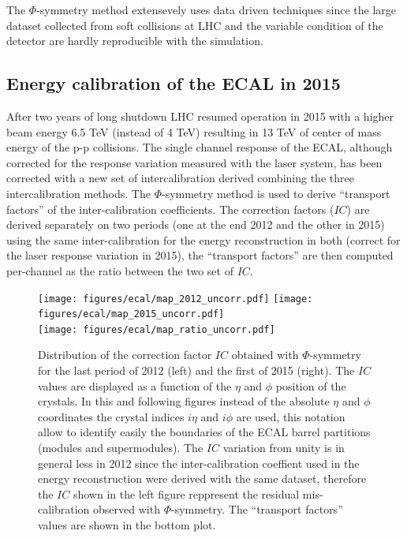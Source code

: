 The $\Phi$-symmetry method extensevely uses data driven techniques since the large dataset collected from soft collisions
at LHC and the variable condition of the detector are hardly reproducible with the simulation.

\subsection{Energy calibration of the ECAL in 2015}
\label{sec:calib_2015}

After two years of long shutdown LHC resumed operation in 2015 with a higher beam energy 6.5 TeV (instead of 4 TeV) resulting
in 13 TeV of center of mass energy of the p-p collisions. The single channel response of the ECAL, although corrected
for the response variation measured with the laser system, has been corrected with a new set of intercalibration
derived combining the three intercalibration methods. The $\Phi$-symmetry method is used to derive ``transport factors''
of the inter-calibration coefficients. The correction factors ($IC$) are derived separately on two periods
(one at the end 2012 and the other in 2015) using the same inter-calibration for the energy reconstruction in both
(correct for the laser response variation in 2015), the ``transport factors'' are then computed per-channel as the
ratio between the two set of $IC$.

\begin{figure}[h!]
  \centering
  \texttt{[image: figures/ecal/map\_2012\_uncorr.pdf]}
  \texttt{[image: figures/ecal/map\_2015\_uncorr.pdf]}\\
  \texttt{[image: figures/ecal/map\_ratio\_uncorr.pdf]}
  \caption{Distribution of the correction factor $IC$ obtained with $\Phi$-symmetry for the last
    period of 2012 (left) and the first of 2015 (right). The $IC$ values are displayed as a function
    of the $\eta$ and $\phi$ position of the crystals. In this and following figures instead of the absolute
    $\eta$ and $\phi$ coordinates the crystal indices $i\eta$ and $i\phi$ are used, this notation
    allow to identify easily the boundaries of the ECAL barrel partitions (modules and supermodules).
    The $IC$ variation from unity is in general less in 2012 since the inter-calibration coeffient used
    in the energy reconstruction were derived with the same dataset, therefore the $IC$ shown in the left figure
    reppresent the residual mis-calibration observed with $\Phi$-symmetry. The ``transport factors'' values
  are shown in the bottom plot.}
  \label{fig:ic_phisym}
\end{figure}

